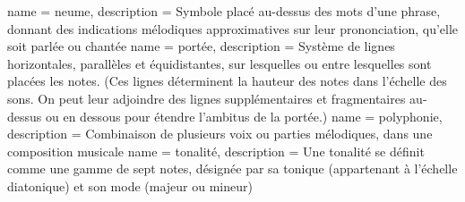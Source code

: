 {
        name = neume,
        description = {Symbole placé au-dessus des mots d'une phrase, donnant des indications mélodiques approximatives sur leur prononciation, qu'elle soit parlée ou chantée}        
}
{
	name = {port{é}e},
	description = {Système de lignes horizontales, parallèles et équidistantes, sur lesquelles ou entre lesquelles sont placées les notes. (Ces lignes déterminent la hauteur des notes dans l'échelle des sons. On peut leur adjoindre des lignes supplémentaires et fragmentaires au-dessus ou en dessous pour étendre l'ambitus de la portée.)}	
}
{
	name = {polyphonie},
	description = {Combinaison de plusieurs voix ou parties mélodiques, dans une composition musicale}	
}
{
	name = {tonalit{é}},
	description = {Une tonalité se définit comme une gamme de sept notes, désignée par sa tonique (appartenant à l'échelle diatonique) et son mode (majeur ou mineur)}
}